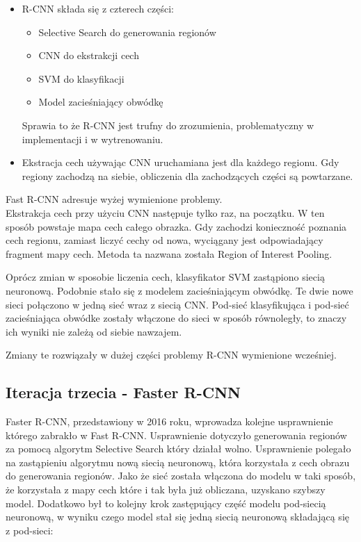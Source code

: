 \begin{itemize}
	\item R-CNN składa się z czterech części:
		\begin{itemize}
			\item Selective Search do generowania regionów
			\item CNN do ekstrakcji cech
			\item SVM do klasyfikacji
			\item Model zacieśniający obwódkę
		\end{itemize}
		Sprawia to że R-CNN jest trufny do zrozumienia, problematyczny w implementacji i w wytrenowaniu.
	\item Ekstracja cech używając CNN uruchamiana jest dla każdego regionu. Gdy regiony zachodzą na siebie, obliczenia dla zachodzących części są powtarzane.
\end{itemize}

Fast R-CNN adresuje wyżej wymienione problemy. \\

Ekstrakcja cech przy użyciu CNN następuje tylko raz, na początku. W ten sposób powstaje mapa cech całego obrazka. Gdy zachodzi konieczność poznania cech regionu, zamiast liczyć cechy od nowa, wyciągany jest odpowiadający fragment mapy cech. Metoda ta nazwana została Region of Interest Pooling.

Oprócz zmian w sposobie liczenia cech, klasyfikator SVM zastąpiono siecią neuronową. Podobnie stało się z modelem zacieśniającym obwódkę. Te dwie nowe sieci połączono w jedną sieć wraz z siecią CNN. Pod-sieć klasyfikująca i pod-sieć zacieśniająca obwódke zostały włączone do sieci w sposób równoległy, to znaczy ich wyniki nie zależą od siebie nawzajem.

Zmiany te rozwiązały w dużej części problemy R-CNN wymienione wcześniej.

\subsection{Iteracja trzecia - Faster R-CNN}


Faster R-CNN, przedstawiony w 2016 roku, wprowadza kolejne usprawnienie którego zabrakło w Fast R-CNN. Usprawnienie dotyczyło generowania regionów za pomocą algorytm Selective Search który działał wolno. Usprawnienie polegało na zastąpieniu algorytmu nową siecią neuronową, która korzystała z cech obrazu do generowania regionów. Jako że sieć została włączona do modelu w taki sposób, że korzystała z mapy cech które i tak była już obliczana, uzyskano szybszy model. Dodatkowo był to kolejny krok zastępujący część modelu pod-siecią neuronową, w wyniku czego model stał się jedną siecią neuronową składającą się z pod-sieci:

